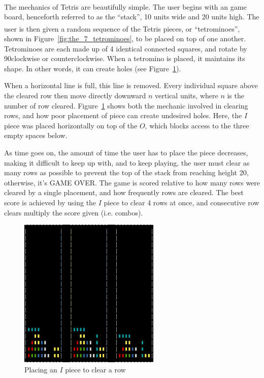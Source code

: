 \documentclass[fontsize=12pt]{article}
\def\tetris{Tetris\textsuperscript{\textregistered}}
\begin{document}
\par The mechanics of \tetris{} are beautifully simple. The user begins with an game board, henceforth referred to as the ``stack'', 10 units wide and 20 units high. The user is then given a random sequence of the \tetris{} pieces, or ``tetrominoes'', shown in Figure~\ref{fig:the_7_tetrominoes}, to be placed on top of one another. Tetrominoes are each made up of 4 identical connected squares, and rotate by 90\textdegree clockwise or counterclockwise. When a tetromino is placed, it maintains its shape. In other words, it can create holes (see Figure~\ref{fig:placing_an_i_piece_to_clear_a_row}).
\par When a horizontal line is full, this line is removed. Every individual square above the cleared row then move directly downward $n$ vertical units, where $n$ is the number of row cleared. Figure~\ref{fig:placing_an_i_piece_to_clear_a_row} shows both the mechanic involved in clearing rows, and how poor placement of piece can create undesired holes. Here, the $I$ piece was placed horizontally on top of the $O$, which blocks access to the three empty spaces below.
\par As time goes on, the amount of time the user has to place the piece decreases, making it difficult to keep up with, and to keep playing, the user must clear as many rows as possible to prevent the top of the stack from reaching height 20, otherwise, it's GAME OVER. The game is scored relative to how many rows were cleared by a single placement, and how frequently rows are cleared. The best score is achieved by using the $I$ piece to clear 4 rows at once, and consecutive row clears multiply the score given (i.e. combos).

\begin{figure}[h!]
  \centering
  \includegraphics[width=0.6\textwidth, height=0.4\textwidth]{figures/rowclear-crop}
  \caption{Placing an $I$ piece to clear a row}
  \label{fig:placing_an_i_piece_to_clear_a_row}
\end{figure}
\end{document}
